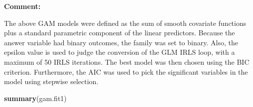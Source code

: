 \documentclass[
  11pt,
]{article}
\newenvironment{Shaded}{\begin{snugshade}}{\end{snugshade}}
\newcommand{\FunctionTok}[1]{\textcolor[rgb]{0.13,0.29,0.53}{\textbf{#1}}}
\newcommand{\NormalTok}[1]{#1}
\begin{document}
\hfill\break
\textbf{Comment:}

The above GAM models were defined as the sum of smooth covariate
functions plus a standard parametric component of the linear predictors.
Because the answer variable had binary outcomes, the family was set to
binary. Also, the epsilon value is used to judge the conversion of the
GLM IRLS loop, with a maximum of 50 IRLS iterations. The best model was
then chosen using the BIC criterion. Furthermore, the AIC was used to
pick the significant variables in the model using stepwise selection.

\begin{Shaded}
\begin{Highlighting}[]
\FunctionTok{summary}\NormalTok{(gam.fit1)}
\end{Highlighting}
\end{Shaded}
\end{document}
